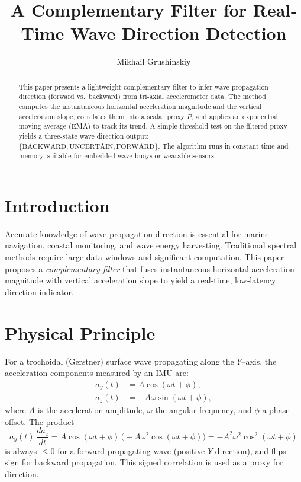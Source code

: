 \documentclass[11pt,letterpaper]{article}
\title{A Complementary Filter for Real‐Time Wave Direction Detection}
\author{Mikhail Grushinskiy}
\affil{Independent Researcher, 2025}
\begin{document}
\maketitle

\begin{abstract}
This paper presents a lightweight complementary filter to infer wave propagation direction (forward vs.\ backward) from tri‐axial accelerometer data.  The method computes the instantaneous horizontal acceleration magnitude and the vertical acceleration slope, correlates them into a scalar proxy \(P\), and applies an exponential moving average (EMA) to track its trend.  A simple threshold test on the filtered proxy yields a three‐state wave direction output: \(\{\text{BACKWARD},\text{UNCERTAIN},\text{FORWARD}\}\).  The algorithm runs in constant time and memory, suitable for embedded wave buoys or wearable sensors.
\end{abstract}

\section{Introduction}
Accurate knowledge of wave propagation direction is essential for marine navigation, coastal monitoring, and wave energy harvesting.  Traditional spectral methods require large data windows and significant computation. This paper proposes a \emph{complementary filter} that fuses instantaneous horizontal acceleration magnitude with vertical acceleration slope to yield a real‐time, low‐latency direction indicator.

\section{Physical Principle}
For a trochoidal (Gerstner) surface wave propagating along the \(Y\)–axis, the acceleration components measured by an IMU are:
\begin{align*}
a_y(t) &= A\cos(\omega t + \phi),\\
a_z(t) &= -A\omega\sin(\omega t + \phi),
\end{align*}
where \(A\) is the acceleration amplitude, \(\omega\) the angular frequency, and \(\phi\) a phase offset.  The product
\[
a_y(t)\,\frac{d a_z}{dt}
= A\cos(\omega t+\phi)\,\bigl(-A\omega^2\cos(\omega t+\phi)\bigr)
= -A^2\omega^2\cos^2(\omega t+\phi)
\]
is always \(\le0\) for a forward‐propagating wave (positive \(Y\) direction), and flips sign for backward propagation.  This signed correlation is used as a proxy for direction.
\end{document}
